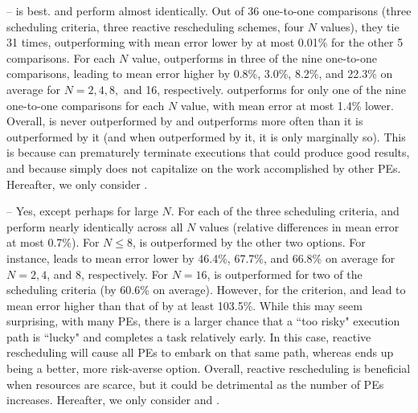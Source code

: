  --
\dependent is best.  \dependent and \independent perform almost
identically.  Out of 36 one-to-one comparisons (three scheduling criteria,
three reactive rescheduling schemes, four $N$ values), they tie 31 times,
\dependent outperforming \independent with mean error lower by at most
0.01\% for the other 5 comparisons.  For each $N$ value, \dependent
outperforms \aggressive in three of the nine one-to-one comparisons,
\aggressive leading to mean error higher by 0.8\%, 3.0\%, 8.2\%, and 22.3\%
on average for $N=2, 4, 8,$ and 16, respectively.  \aggressive outperforms
\dependent for only one of the nine one-to-one comparisons for each $N$
value, with mean error at most 1.4\% lower.  Overall, \dependent is never
outperformed by \independent and outperforms \aggressive more often than it is
outperformed by it (and when outperformed by it, it is only marginally so).
This is because \aggressive can prematurely terminate executions that could
produce good results, and because \independent simply does not capitalize
on the work accomplished by other PEs.  Hereafter, we only consider
\dependent.


 --
Yes, except perhaps for large $N$. For each of the three 
scheduling criteria,
\variant and \aggressive perform
nearly identically across all $N$ values (relative differences in mean error at most
0.7\%).  For $N{\leq}8$, \off is outperformed by the other two options. For
instance, \aggressive leads to mean error lower by 46.4\%, 67.7\%, and 66.8\%
on average for $N{=}2, 4$, and 8, respectively. For $N{=}16$, \off
is outperformed for two of the scheduling criteria (by 60.6\% on average). However,
for the \expectederror criterion, \variant and \aggressive lead to mean error higher than that of
\off by at least 103.5\%. While this may seem surprising, with
many PEs, there is a larger chance that a ``too risky" execution path is
``lucky" and completes a task relatively early. In this case, reactive
rescheduling will cause all PEs to embark on that same path, whereas \off
ends up being a better, more risk-averse option.  Overall, reactive
rescheduling is beneficial when resources are scarce, but it could be
detrimental as the number of PEs increases.  Hereafter, we only consider
\aggressive and \off.



